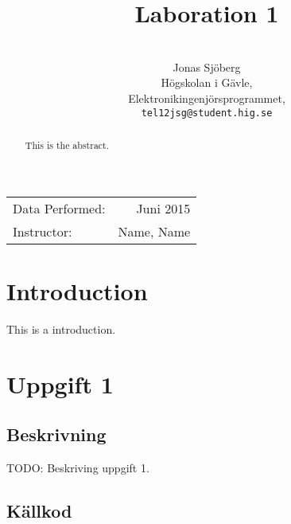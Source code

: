 \documentclass[11pt,a4paper]{article}
\title{Laboration 1}
\author{\\
  Jonas Sjöberg\\
  Högskolan i Gävle,\\
  Elektronikingenjörsprogrammet,\\
  \texttt{tel12jsg@student.hig.se}}
\date{}
\begin{document}
\maketitle

\begin{center}
\begin{tabular}{l r}
    Data Performed: & Juni 2015 \\
    Instructor: & Name, Name
\end{tabular}
\end{center}

\begin{abstract}
This is the abstract.
\end{abstract}

\newpage

{
\setcounter{tocdepth}{3}
\tableofcontents
}

\newpage

\section{Introduction}\label{setup}
This is a introduction.

\section{Uppgift 1}\label{uppgift-1}

\subsection{Beskrivning}
TODO: Beskriving uppgift 1.

\subsection{Källkod}\label{subsection-1}
\inputminted[]{java}{../src/Lab1Uppg01.java}
\end{document}
